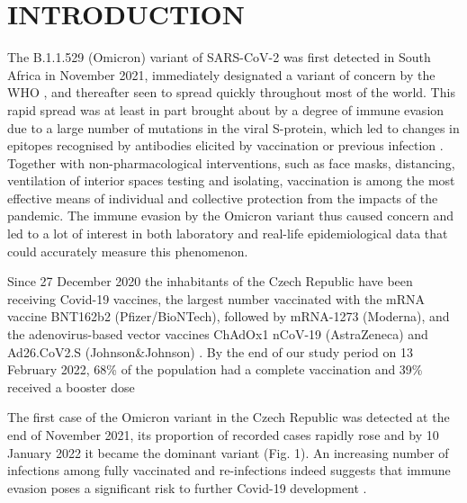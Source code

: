 \documentclass[a4paper,12pt]{article}
\def\figdiscrim{1}
\begin{document}
\setlength{\parindent}{0cm}

\section*{INTRODUCTION}
\label{sec1}

\doublespacing


The B.1.1.529 (Omicron) variant of SARS-CoV-2 was first detected in South Africa in November 2021, immediately designated a variant of concern by the WHO \citep{who2021omicron}, and  thereafter seen to spread quickly throughout most of the world. This rapid spread was at least in part brought about by a degree of immune evasion due to a large number of mutations in the viral S-protein, which led to changes in epitopes recognised by antibodies elicited by vaccination or previous infection \citep{mccallum2022}. Together with non-pharmacological interventions, such as face masks, distancing, ventilation of interior spaces testing and isolating, vaccination is among the most effective means of individual and collective protection from the impacts of the pandemic. The immune evasion by the Omicron variant thus caused concern and led to a lot of interest in both laboratory and real-life epidemiological data that could accurately measure this phenomenon.
\label{sec1}

Since 27 December 2020 the inhabitants of the Czech Republic have been receiving Covid-19 vaccines, the largest number vaccinated with the mRNA vaccine BNT162b2 (Pfizer/BioNTech), followed by mRNA-1273 (Moderna), and the adenovirus-based vector vaccines ChAdOx1 nCoV-19 (AstraZeneca) and Ad26.CoV2.S (Johnson\&Johnson) \citep{mzcr}. By the end of our study period on 13 February 2022, 68\% of the population had a complete vaccination and 39\% received a booster dose  \citep{mzcr} 

The first case of the Omicron variant in the Czech Republic was detected at the end of November 2021, its proportion of recorded cases rapidly rose and by 10 January 2022 it became the dominant variant  (Fig. \figdiscrim). An increasing number of infections among fully vaccinated and re-infections indeed suggests that immune evasion poses a significant risk to further Covid-19 development \citep{mzcr}. 
\end{document}
